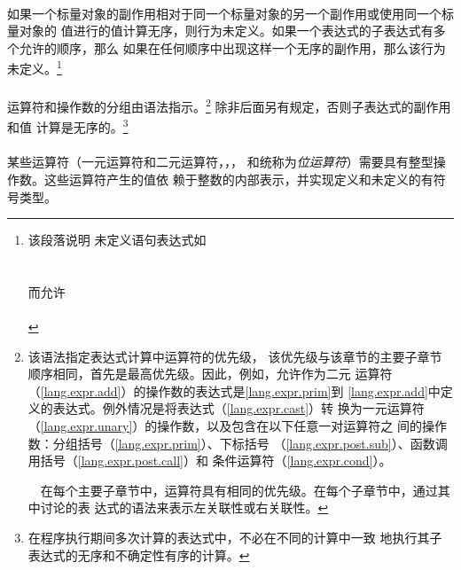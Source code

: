 \paragraph{}
如果一个标量对象的副作用相对于同一个标量对象的另一个副作用或使用同一个标量对象的
值进行的值计算无序，则行为未定义。如果一个表达式的子表达式有多个允许的顺序，那么
如果在任何顺序中出现这样一个无序的副作用，那么该行为未定义。\footnote{该段落说明
未定义语句表达式如                                                            \\
\mbox{\hspace{4em}}                                          \\
\mbox{\hspace{4em}}                                           \\
而允许                                                                        \\
\mbox{\hspace{4em}}                                            \\
\mbox{\hspace{4em}}}

\paragraph{}
运算符和操作数的分组由语法指示。\footnote{该语法指定表达式计算中运算符的优先级，
该优先级与该章节的主要子章节顺序相同，首先是最高优先级。因此，例如，允许作为二元
\tm{+}运算符（\ref{lang.expr.add}）的操作数的表达式是\ref{lang.expr.prim}到
\ref{lang.expr.add}中定义的表达式。例外情况是将表达式（\ref{lang.expr.cast}）转
换为一元运算符（\ref{lang.expr.unary}）的操作数，以及包含在以下任意一对运算符之
间的操作数：分组括号\tm{()}（\ref{lang.expr.prim}）、下标括号\tm{[]}
（\ref{lang.expr.post.sub}）、函数调用括号\tm{()}（\ref{lang.expr.post.call}）和
条件运算符（\ref{lang.expr.cond}）。\vspace{0.2cm}

\ \ 在每个主要子章节中，运算符具有相同的优先级。在每个子章节中，通过其中讨论的表
达式的语法来表示左关联性或右关联性。} 除非后面另有规定，否则子表达式的副作用和值
计算是无序的。\footnote{在程序执行期间多次计算的表达式中，不必在不同的计算中一致
地执行其子表达式的无序和不确定性有序的计算。}

\paragraph{}
某些运算符（一元运算符\tm{\~}和二元运算符\tm{\tl{}\tl}，\tm{\tg{}\tg}，\tm{\&}，
\tm{\^}和\tm{|}统称为\textit{位运算符}）需要具有整型操作数。这些运算符产生的值依
赖于整数的内部表示，并实现定义和未定义的有符号类型。

